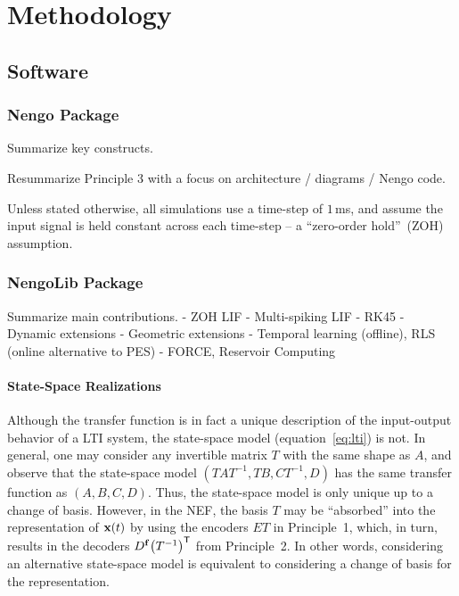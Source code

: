 \chapter{Methodology}
\label{chapt:methodology}


\section{Software}

\subsection{Nengo Package}

Summarize key constructs.

Resummarize Principle 3 with a focus on architecture / diagrams / Nengo code.

Unless stated otherwise, all simulations use a time-step of $1$\,ms, and assume the input signal is held constant across each time-step -- a ``zero-order hold''~(ZOH) assumption.

\subsection{NengoLib Package}
\label{sec:nengolib}

Summarize main contributions.
 - ZOH LIF
 - Multi-spiking LIF
 - RK45
 - Dynamic extensions
 - Geometric extensions
 - Temporal learning (offline), RLS (online alternative to PES)
 - FORCE, Reservoir Computing

\subsubsection{State-Space Realizations}

Although the transfer function is in fact a unique description of the input-output behavior of a LTI system, the state-space model (equation~\ref{eq:lti}) is not.
In general, one may consider any invertible matrix $T$ with the same shape as $A$, and observe that the state-space model $(TAT^{-1}\text{,}\, TB\text{,}\, CT^{-1}\text{,}\, D)$ has the same transfer function as $(A\text{,}\, B\text{,}\, C\text{,}\, D)$.
Thus, the state-space model is only unique up to a change of basis.
However, in the NEF, the basis $T$ may be ``absorbed'' into the representation of $\mathbf{x}(t)$ by using the encoders $ET$ in Principle~1, which, in turn, results in the decoders $D^{\mathbf{f}} {\left(T^{-1}\right)}^\mathsf{T}$ from Principle~2.
In other words, considering an alternative state-space model is equivalent to considering a change of basis for the representation.

